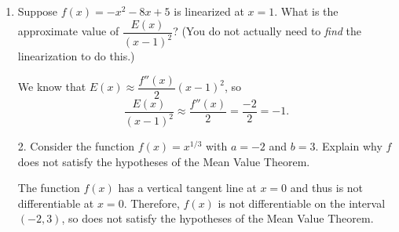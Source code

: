 \documentclass[11pt]{article}
\begin{document}
\pagestyle{empty}
\newsavebox{\quizfront}
\begin{lrbox}{\quizfront}
\begin{minipage}[top][4.5in][t]{\textwidth} \setlength{\parindent}{1.5em}
\drawtitle
\vspace{-0.5in}
\begin{enumerate}

\item Suppose $f(x) = -x^2 - 8x + 5$ is linearized at $x=1$. What is
  the approximate value of $\dfrac{E(x)}{(x-1)^2}$? (You do not
  actually need to \emph{find} the linearization to do this.)

\vfill

{\color{blue}
  We know that $E(x)\approx \dfrac{f''(x)}{2}(x-1)^2$, so
  \[
  \frac{E(x)}{(x-1)^2} \approx \frac{f''(x)}{2} = \frac{-2}{2} = -1.
  \]
}

\vfill

\end{enumerate}



\end{minipage}
\end{lrbox}

\newsavebox{\quizback}
\begin{lrbox}{\quizback}
\begin{minipage}[top][4.5in][t]{\textwidth} \setlength{\parindent}{1.5em}
\begin{enumerate}
\item[2.] Consider the function $f(x) = x^{1/3}$ with $a=-2$ and
  $b=3$. Explain why $f$ does not satisfy the hypotheses of the Mean
  Value Theorem.

\vfill

{\color{blue} The function $f(x)$ has a vertical tangent line at $x=0$
  and thus is not differentiable at $x=0$.  Therefore, $f(x)$ is not
  differentiable on the interval $(-2,3)$, so does not satisfy the
  hypotheses of the Mean Value Theorem.  }

\vfill

\end{enumerate}
\end{minipage}
\end{lrbox}

\noindent \usebox{\quizfront}
\vfill
\noindent \usebox{\quizback}

\end{document}
